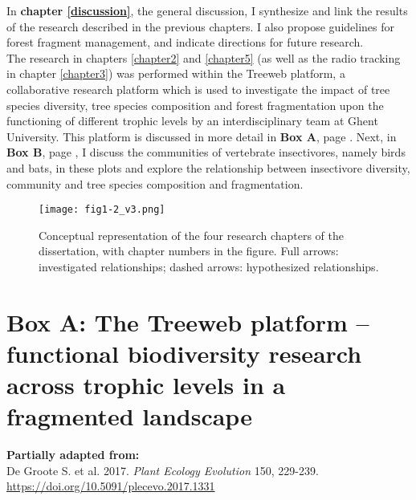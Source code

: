 \documentclass[10pt, twoside]{book} %
\begin{document}
In \textbf{chapter \ref{discussion}}, the general discussion, I synthesize and link the results of the research described in the previous chapters. I also propose guidelines for forest fragment management, and indicate directions for future research.\\

The research in chapters \ref{chapter2} and \ref{chapter5} (as well as the radio tracking in chapter \ref{chapter3}) was performed within the Treeweb platform, a collaborative research platform which is used to investigate the impact of tree species diversity, tree species composition and forest fragmentation upon the functioning of different trophic levels by an interdisciplinary team at Ghent University. This platform is discussed in more detail in \textbf{Box A}, page \pageref{boxa}. Next, in \textbf{Box B}, page \pageref{boxb}, I discuss the communities of vertebrate insectivores, namely birds and bats, in these plots and explore the relationship between insectivore diversity, community and tree species composition and fragmentation.\\

	
	\begin{figure}[bh!]
		\begin{center}
			\texttt{[image: fig1-2\_v3.png]}
		\end{center}
		\caption{Conceptual representation of the four research chapters of the dissertation, with chapter numbers in the figure. Full arrows: investigated relationships; dashed arrows: hypothesized relationships.  \label{fig1-2}}
	\end{figure}
	
	\clearpage
	\newpage
	
	\section*{Box A: The Treeweb platform -- functional \mbox{biodiversity} research across trophic levels in a fragmented landscape}\label{boxa}
	\vspace{1.2cm}
	\textbf{Partially adapted from:}\\
	De Groote S. et al. 2017. \textit{Plant Ecology Evolution} 150, 229-239. \url{https://doi.org/10.5091/plecevo.2017.1331}
	\vspace{1.2cm}
	
\end{document}
